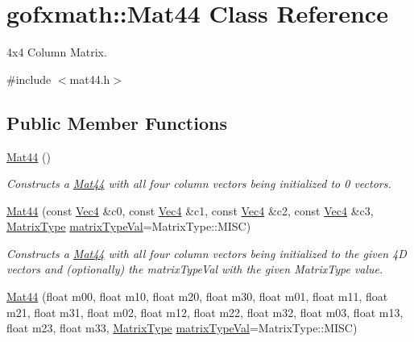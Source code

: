 \hypertarget{classgofxmath_1_1_mat44}{}\section{gofxmath\+:\+:Mat44 Class Reference}
\label{classgofxmath_1_1_mat44}


4x4 Column Matrix.  




{\ttfamily \#include $<$mat44.\+h$>$}

\subsection*{Public Member Functions}
\begin{DoxyCompactItemize}
\item 
\hyperlink{classgofxmath_1_1_mat44_ab452a16f32c33e05bfce858032906ee2}{Mat44} ()
\begin{DoxyCompactList}\small\item\em Constructs a \hyperlink{classgofxmath_1_1_mat44}{Mat44} with all four column vectors being initialized to 0 vectors. \end{DoxyCompactList}\item 
\hyperlink{classgofxmath_1_1_mat44_a9cd098e441ff71da3baa92e3698775a6}{Mat44} (const \hyperlink{classgofxmath_1_1_vec4}{Vec4} \&c0, const \hyperlink{classgofxmath_1_1_vec4}{Vec4} \&c1, const \hyperlink{classgofxmath_1_1_vec4}{Vec4} \&c2, const \hyperlink{classgofxmath_1_1_vec4}{Vec4} \&c3, \hyperlink{group___s_i_s_d_mat_math_ga0434ae8f7ee0d8d40277184552eebef4}{Matrix\+Type} \hyperlink{classgofxmath_1_1_mat44_a00c48d54f2828ae7c63821723a1c210f}{matrix\+Type\+Val}=Matrix\+Type\+::\+M\+I\+S\+C)
\begin{DoxyCompactList}\small\item\em Constructs a \hyperlink{classgofxmath_1_1_mat44}{Mat44} with all four column vectors being initialized to the given 4\+D vectors and (optionally) the matrix\+Type\+Val with the given Matrix\+Type value. \end{DoxyCompactList}\item 
\hyperlink{classgofxmath_1_1_mat44_a81b9064e89f6781310caeb8e7c68623e}{Mat44} (float m00, float m10, float m20, float m30, float m01, float m11, float m21, float m31, float m02, float m12, float m22, float m32, float m03, float m13, float m23, float m33, \hyperlink{group___s_i_s_d_mat_math_ga0434ae8f7ee0d8d40277184552eebef4}{Matrix\+Type} \hyperlink{classgofxmath_1_1_mat44_a00c48d54f2828ae7c63821723a1c210f}{matrix\+Type\+Val}=Matrix\+Type\+::\+M\+I\+S\+C)

\end{DoxyCompactItemize}
